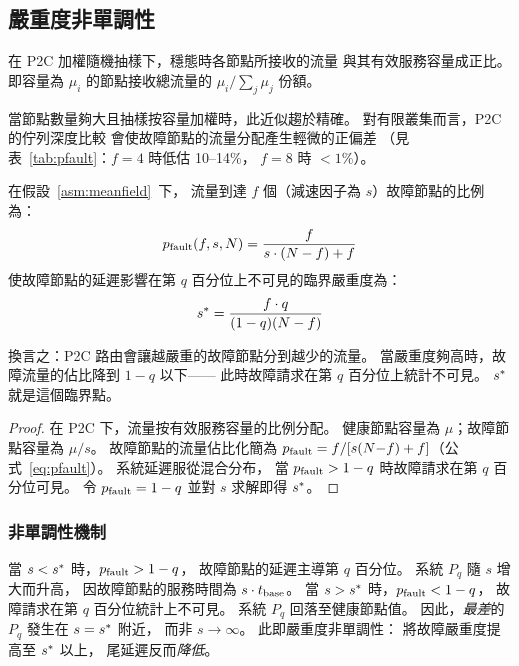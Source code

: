 \subsection{嚴重度非單調性}
\label{sec:nonmono}

\begin{assumption}[平均場 P2C 近似]
\label{asm:meanfield}
在 P2C 加權隨機抽樣下，穩態時各節點所接收的流量
與其有效服務容量成正比。
即容量為 $\mu_i$ 的節點接收總流量的
$\mu_i / \sum_j \mu_j$ 份額。
\end{assumption}

當節點數量夠大且抽樣按容量加權時，此近似趨於精確。
對有限叢集而言，P2C 的佇列深度比較
會使故障節點的流量分配產生輕微的正偏差
（見表~\ref{tab:pfault}：$f=4$ 時低估 10--14\%，
$f=8$ 時 $< 1$\%）。

\medskip

\begin{theorem}[臨界嚴重度]
\label{thm:sstar}
在假設~\ref{asm:meanfield}~下，
流量到達 $f$ 個（減速因子為 $s$）故障節點的比例為：
\begin{equation}
  p_{\text{fault}}(f, s, N) = \frac{f}{s \cdot (N-f) + f}
  \label{eq:pfault}
\end{equation}
使故障節點的延遲影響在第 $q$ 百分位上不可見的臨界嚴重度為：
\begin{equation}
  s^{*} = \frac{f \cdot q}{(1-q)(N-f)}
  \label{eq:sstar_deriv}
\end{equation}
\end{theorem}

換言之：P2C 路由會讓越嚴重的故障節點分到越少的流量。
當嚴重度夠高時，故障流量的佔比降到 $1-q$ 以下——
此時故障請求在第 $q$ 百分位上統計不可見。
$s^{*}$ 就是這個臨界點。

\begin{proof}
在 P2C 下，流量按有效服務容量的比例分配。
健康節點容量為 $\mu$；故障節點容量為 $\mu/s$。
故障節點的流量佔比化簡為
$p_{\text{fault}} = f / [s(N{-}f) + f]$（公式~\ref{eq:pfault}）。
系統延遲服從混合分布，
當 $p_{\text{fault}} > 1-q$ 時故障請求在第 $q$ 百分位可見。
令 $p_{\text{fault}} = 1-q$ 並對 $s$ 求解即得 $s^{*}$。
\end{proof}

\medskip

\subsubsection*{非單調性機制}
當 $s < s^{*}$ 時，$p_{\text{fault}} > 1-q$，
故障節點的延遲主導第 $q$ 百分位。
系統 $P_q$ 隨 $s$ 增大而升高，
因故障節點的服務時間為 $s \cdot t_{\text{base}}$。
當 $s > s^{*}$ 時，$p_{\text{fault}} < 1-q$，
故障請求在第 $q$ 百分位統計上不可見。
系統 $P_q$ 回落至健康節點值。
因此，\emph{最差}的 $P_q$ 發生在 $s = s^{*}$ 附近，
而非 $s \to \infty$。
此即嚴重度非單調性：
將故障嚴重度提高至 $s^{*}$ 以上，
尾延遲反而\emph{降低}。


